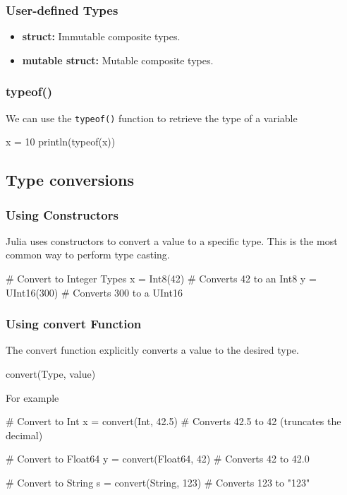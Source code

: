 \documentclass{report}
\begin{document}
    \bigbreak \noindent 
    \subsubsection{User-defined Types }
    \begin{itemize}
        \item \textbf{struct:} Immutable composite types.
        \item \textbf{mutable struct:} Mutable composite types.
    \end{itemize}

    \bigbreak \noindent 
    \subsubsection{typeof()}
    \bigbreak \noindent 
    We can use the \texttt{typeof()} function to retrieve the type of a variable
    \bigbreak \noindent 
    \begin{jlcode}
    x = 10
    println(typeof(x))
    \end{jlcode}







    \bigbreak \noindent 
    \subsection{Type conversions}
    \bigbreak \noindent 
    \subsubsection{Using Constructors}
    \bigbreak \noindent 
    Julia uses constructors to convert a value to a specific type. This is the most common way to perform type casting.
    \bigbreak \noindent 
    \begin{jlcode}
        # Convert to Integer Types
        x = Int8(42)       # Converts 42 to an Int8
        y = UInt16(300)    # Converts 300 to a UInt16
    \end{jlcode}

    \bigbreak \noindent 
    \subsubsection{Using convert Function}
    \bigbreak \noindent 
    The convert function explicitly converts a value to the desired type.
    \bigbreak \noindent 
    \begin{jlcode}
    convert(Type, value)
    \end{jlcode}
    \bigbreak \noindent 
    For example
    \bigbreak \noindent 
    \begin{jlcode}
        # Convert to Int
        x = convert(Int, 42.5)       # Converts 42.5 to 42 (truncates the decimal)

        # Convert to Float64
        y = convert(Float64, 42)     # Converts 42 to 42.0

        # Convert to String
        s = convert(String, 123)     # Converts 123 to "123"
    \end{jlcode}
\end{document}
